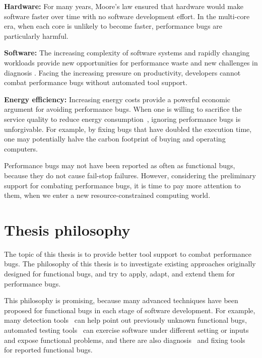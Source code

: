 {\bf Hardware:} For many years,  
  Moore's law ensured that hardware would make software faster over time 
  with no software
  development effort. In the multi-core era, when each core is unlikely to 
  become faster, performance bugs are particularly harmful.

{\bf Software:} The increasing complexity of software systems and rapidly 
changing workloads provide new opportunities for performance waste and
new challenges in diagnosis
\citep{BloatFSE2008}.
Facing the increasing pressure on productivity, 
developers cannot combat performance bugs without automated tool support. 

{\bf Energy efficiency:} 
Increasing energy costs provide a powerful economic 
argument for avoiding performance bugs. 
When one is willing to sacrifice the service quality to reduce 
energy consumption~\citep{green.pldi10,asplos11karthik}, 
ignoring performance bugs is unforgivable.
For example, by fixing bugs that have doubled the
execution time,
one may potentially
halve the carbon footprint of buying and operating computers.

Performance bugs may not have been reported as often as functional bugs, because 
they do not cause fail-stop failures.
However, considering the preliminary support for
combating performance bugs,
it is time to pay more attention to them, 
when we enter a new resource-constrained computing world.

\section{Thesis philosophy}

The topic of this thesis is to provide better tool support to combat performance bugs. 
The philosophy of this thesis is to investigate existing approaches originally designed for 
functional bugs,
and try to apply, adapt, and extend them for performance bugs. 

This philosophy is promising, 
because many advanced techniques have been proposed for functional bugs in each stage of software development. 
For example, many detection tools~\citep{chouasplos00,billpugh,PRMiner05,semanticpatch,fortify} 
can help point out previously unknown functional bugs, 
automated testing tools~\citep{KLEE,s2e} can exercise software under different setting 
or inputs and expose functional problems, 
and there are also diagnosis~\citep{liblit03, liblit05, CCI} and 
fixing tools~\citep{afix, ofix, mfix} for reported functional bugs.

